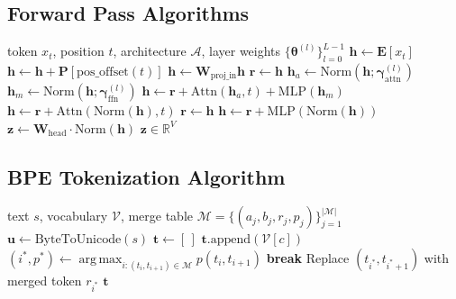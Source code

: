 \documentclass[12pt,a4paper]{article}
\DeclareMathOperator*{\argmax}{arg\,max}
\begin{document}
\subsection{Forward Pass Algorithms}

\begin{algorithm}[H]
\caption{Architecture-Dispatched Forward Pass}
\label{alg:forward}
\begin{algorithmic}[1]
\Require token $x_t$, position $t$, architecture $\mathcal{A}$, layer weights $\{\bm{\theta}^{(l)}\}_{l=0}^{L-1}$
\State $\bm{h} \gets \bm{E}[x_t]$ 
    \State $\bm{h} \gets \bm{h} + \bm{P}[\text{pos\_offset}(t)]$
\EndIf
{}
    \State $\bm{h} \gets \bm{W}_{\text{proj\_in}} \bm{h}$ 
\EndIf
{}
    \State $\bm{r} \gets \bm{h}$ 
     
        \State $\bm{h}_a \gets \text{Norm}(\bm{h}; \bm{\gamma}_{\text{attn}}^{(l)})$
        \State $\bm{h}_m \gets \text{Norm}(\bm{h}; \bm{\gamma}_{\text{ffn}}^{(l)})$
        \State $\bm{h} \gets \bm{r} + \text{Attn}(\bm{h}_a, t) + \text{MLP}(\bm{h}_m)$
    \Else {}
        \State $\bm{h} \gets \bm{r} + \text{Attn}(\text{Norm}(\bm{h}), t)$
        \State $\bm{r} \gets \bm{h}$
        \State $\bm{h} \gets \bm{r} + \text{MLP}(\text{Norm}(\bm{h}))$
    \EndIf
\EndFor
\State $\bm{z} \gets \bm{W}_{\text{head}} \cdot \text{Norm}(\bm{h})$ 
\State \Return $\bm{z} \in \mathbb{R}^V$
\end{algorithmic}
\end{algorithm}

\subsection{BPE Tokenization Algorithm}

\begin{algorithm}[H]
\caption{Byte-Pair Encoding with Merge Table}
\label{alg:bpe}
\begin{algorithmic}[1]
\Require text $s$, vocabulary $\mathcal{V}$, merge table $\mathcal{M} = \{(a_j, b_j, r_j, p_j)\}_{j=1}^{|\mathcal{M}|}$
\State $\bm{u} \gets \text{ByteToUnicode}(s)$ 
\State $\bm{t} \gets [\,]$
    \State $\bm{t}.\text{append}(\mathcal{V}[c])$ 
\EndFor
{}
    \State $(i^*, p^*) \gets \displaystyle\argmax_{i : (t_i, t_{i+1}) \in \mathcal{M}} p(t_i, t_{i+1})$
     \textbf{break}
    \EndIf
    \State Replace $(t_{i^*}, t_{i^*+1})$ with merged token $r_{i^*}$
\EndWhile
\State \Return $\bm{t}$ 
\end{algorithmic}
\end{algorithm}
\end{document}
